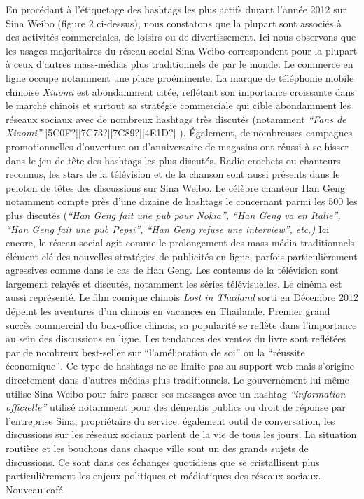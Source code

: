 En procédant à l{\textquoteright}étiquetage des hashtags les plus actifs durant l{\textquoteright}année 2012 sur Sina Weibo (figure 2 ci-dessus), nous constatons que la plupart sont associés à des activités commerciales, de loisirs ou de divertissement. Ici nous observons que les usages majoritaires du réseau social Sina Weibo correspondent pour la plupart à ceux d{\textquoteright}autres mass-médias plus traditionnels de par le monde. Le commerce en ligne occupe notamment une place proéminente. La marque de téléphonie mobile chinoise \textit{Xiaomi }est abondamment citée, reflétant son importance croissante dans le marché chinois et surtout sa stratégie commerciale qui cible abondamment les réseaux sociaux avec de nombreux hashtags très discutés (notamment \textit{{\textquotedblleft}Fans de Xiaomi{\textquotedblright} }[5C0F?][7C73?][7C89?][4E1D?] ). Également, de nombreuses campagnes promotionnelles d{\textquoteright}ouverture ou d{\textquoteright}anniversaire de magasins ont réussi à se hisser dans le jeu de t\^ete des hashtags les plus discutés. Radio-crochets ou chanteurs reconnus, les stars de la télévision et de la chanson sont aussi présents dans le peloton de t\^etes des discussions sur Sina Weibo. Le célèbre chanteur Han Geng notamment compte près d{\textquoteright}une dizaine de hashtags le concernant parmi les 500 les plus discutés (\textit{{\textquotedblleft}Han Geng fait une pub pour Nokia{\textquotedblright}, {\textquotedblleft}Han Geng va en Italie{\textquotedblright}, {\textquotedblleft}Han Geng fait une pub Pepsi{\textquotedblright}, {\textquotedblleft}Han Geng refuse une interview{\textquotedblright}, etc.)} Ici encore, le réseau social agit comme le prolongement des mass média traditionnels, élément-clé des nouvelles stratégies de publicités en ligne, parfois particulièrement agressives comme dans le cas de Han Geng. Les contenus de la télévision sont largement relayés et discutés, notamment les séries télévisuelles. Le cinéma est aussi représenté. Le film comique chinois \textit{Lost in Thailand }sorti en Décembre 2012 dépeint les aventures d{\textquoteright}un chinois en vacances en Thailande. Premier grand succès commercial du box-office chinois, sa popularité se reflète dans l{\textquoteright}importance au sein des discussions en ligne. Les tendances des ventes du livre sont reflétées par de nombreux best-seller sur {\textquotedblleft}l{\textquoteright}amélioration de soi{\textquotedblright} ou la {\textquotedblleft}réussite économique{\textquotedblright}\textit{. }Ce type de hashtags ne se limite pas au support web mais s{\textquoteright}origine directement dans d{\textquoteright}autres médias plus traditionnels. Le gouvernement lui-m\^eme utilise Sina Weibo pour faire passer ses messages avec un hashtag \textit{{\textquotedblleft}information officielle{\textquotedblright} }utilisé notamment pour des démentis publics ou droit de réponse par l{\textquoteright}entreprise Sina, propriétaire du service. également outil de conversation, les discussions sur les réseaux sociaux parlent de la vie de tous les jours. La situation routière et les bouchons dans chaque ville sont un des grands sujets de discussions. Ce sont dans ces échanges quotidiens que se cristallisent plus particulièrement les enjeux politiques et médiatiques des réseaux sociaux. Nouveau café 